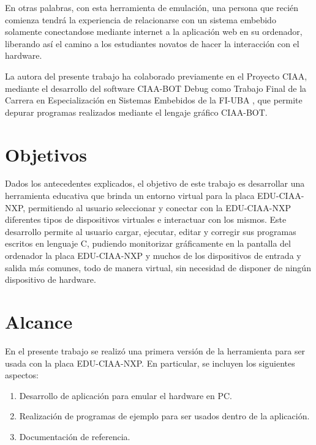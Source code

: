 En otras palabras, con esta herramienta de emulación, una persona que recién comienza tendrá la experiencia de relacionarse con un sistema embebido solamente conectandose mediante internet a la aplicación web en su ordenador, liberando así el camino a los estudiantes novatos de hacer la interacción con el hardware.

La autora del presente trabajo ha colaborado previamente en el Proyecto CIAA, mediante el desarrollo del software CIAA-BOT Debug como Trabajo Final de la Carrera en Especialización en Sistemas Embebidos de la FI-UBA \citep{TrabajoFinalCESE}, que permite depurar programas realizados mediante el lengaje gráfico CIAA-BOT.

\section{Objetivos}

Dados los antecedentes explicados, el objetivo de este trabajo es desarrollar una herramienta educativa que brinda un entorno virtual para la placa EDU-CIAA-NXP, permitiendo al usuario seleccionar y conectar con la EDU-CIAA-NXP diferentes tipos de dispositivos virtuales e interactuar con los mismos. Este desarrollo permite al usuario cargar, ejecutar, editar y corregir sus programas escritos en lenguaje C, pudiendo monitorizar gráficamente en la pantalla del ordenador la placa EDU-CIAA-NXP y muchos de los dispositivos de entrada y salida más comunes, todo de manera virtual, sin necesidad de disponer de ningún dispositivo de hardware.

\section{Alcance}

En el presente trabajo se realizó una primera versión de la herramienta para ser usada con la placa EDU-CIAA-NXP. En particular, se incluyen los siguientes aspectos:

\begin{enumerate}
	\item Desarrollo de aplicación para emular el hardware en PC.
	\item Realización de programas de ejemplo para ser usados dentro de la aplicación.
	\item Documentación de referencia.
\end{enumerate}

